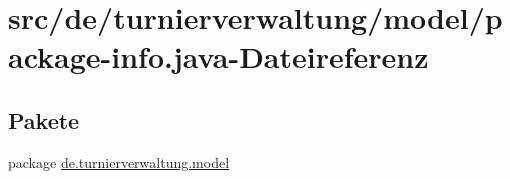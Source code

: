 \hypertarget{model_2package-info_8java}{}\section{src/de/turnierverwaltung/model/package-\/info.java-\/\+Dateireferenz}
\label{model_2package-info_8java}
\subsection*{Pakete}
\begin{DoxyCompactItemize}
\item 
package \hyperlink{namespacede_1_1turnierverwaltung_1_1model}{de.\+turnierverwaltung.\+model}
\end{DoxyCompactItemize}
